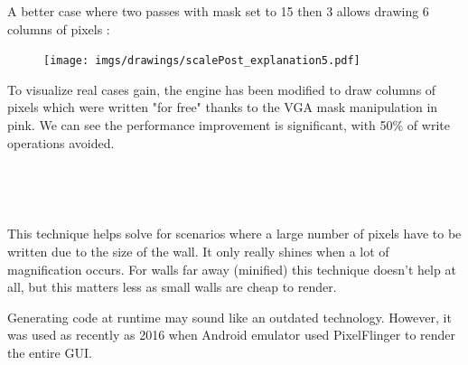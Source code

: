 A better case where two passes with mask set to 15 then 3 allows drawing 6 columns of pixels :\\
 \par
 \begin{minipage}{\textwidth}

\end{minipage}
\par
   \begin{figure}[H]
 \centering
 \texttt{[image: imgs/drawings/scalePost\_explanation5.pdf]}
  
 \end{figure}






To visualize real cases gain, the engine has been modified to draw columns of pixels which were written "for free" thanks to the VGA mask manipulation in pink. We can see the performance improvement is significant, with 50\% of write operations avoided.

\begin{minipage}{\textwidth}
 \centering
\vspace*{0.5cm}\\

\end{minipage}



\par

\begin{minipage}{\textwidth}
 \centering
 \vspace*{0.5cm}\\
\end{minipage}
This technique helps solve for scenarios where a large number of pixels have to be written due to the size of the wall. It only really shines when a lot of magnification occurs. For walls far away (minified) this technique doesn't help at all, but this matters less as small walls are cheap to render.\\
\par
{} Generating code at runtime may sound like an outdated technology. However, it was used as recently as 2016 when Android emulator used PixelFlinger to render the entire GUI.





















